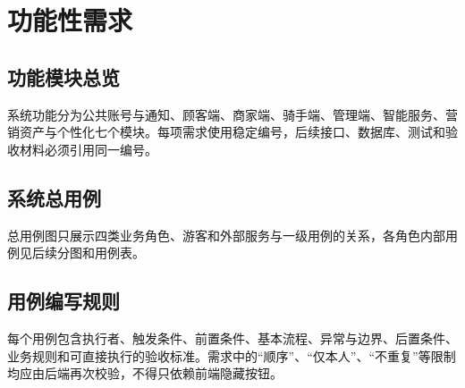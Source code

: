 \section{功能性需求}

\subsection{功能模块总览}


系统功能分为公共账号与通知、顾客端、商家端、骑手端、管理端、智能服务、营销资产与个性化七个模块。每项需求使用稳定编号，后续接口、数据库、测试和验收材料必须引用同一编号。

\subsection{系统总用例}


总用例图只展示四类业务角色、游客和外部服务与一级用例的关系，各角色内部用例见后续分图和用例表。

\subsection{用例编写规则}

每个用例包含执行者、触发条件、前置条件、基本流程、异常与边界、后置条件、业务规则和可直接执行的验收标准。需求中的“顺序”、“仅本人”、“不重复”等限制均应由后端再次校验，不得只依赖前端隐藏按钮。
